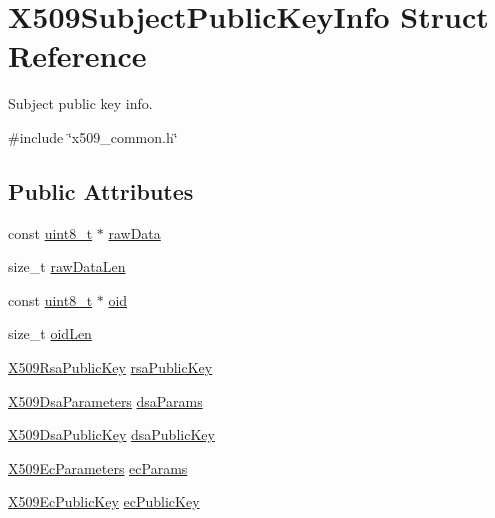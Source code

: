 \hypertarget{structX509SubjectPublicKeyInfo}{}\section{X509\+Subject\+Public\+Key\+Info Struct Reference}
\label{structX509SubjectPublicKeyInfo}


Subject public key info.  




{\ttfamily \#include \char`\"{}x509\+\_\+common.\+h\char`\"{}}

\subsection*{Public Attributes}
\begin{DoxyCompactItemize}
\item 
const \hyperlink{stdint_8h_aba7bc1797add20fe3efdf37ced1182c5}{uint8\+\_\+t} $\ast$ \hyperlink{structX509SubjectPublicKeyInfo_a40099adba11d706e320a0d553b9e2438}{raw\+Data}
\item 
size\+\_\+t \hyperlink{structX509SubjectPublicKeyInfo_a1397c8953cfe641fda3a326479b48dbd}{raw\+Data\+Len}
\item 
const \hyperlink{stdint_8h_aba7bc1797add20fe3efdf37ced1182c5}{uint8\+\_\+t} $\ast$ \hyperlink{structX509SubjectPublicKeyInfo_a90a8b808782b18de901306acd49b0706}{oid}
\item 
size\+\_\+t \hyperlink{structX509SubjectPublicKeyInfo_a7c5d6f507f653f6085ba56e6b4b55912}{oid\+Len}
\item 
\hyperlink{structX509RsaPublicKey}{X509\+Rsa\+Public\+Key} \hyperlink{structX509SubjectPublicKeyInfo_ab8bc6398001418fd21271ff8b791caab}{rsa\+Public\+Key}
\item 
\hyperlink{structX509DsaParameters}{X509\+Dsa\+Parameters} \hyperlink{structX509SubjectPublicKeyInfo_a2a4f7c14413231aa4a09a59390b4f6c0}{dsa\+Params}
\item 
\hyperlink{structX509DsaPublicKey}{X509\+Dsa\+Public\+Key} \hyperlink{structX509SubjectPublicKeyInfo_aca3c9dc2e4fefc2e5ac0f1db6baedccc}{dsa\+Public\+Key}
\item 
\hyperlink{structX509EcParameters}{X509\+Ec\+Parameters} \hyperlink{structX509SubjectPublicKeyInfo_af45ca47e19db60631c9fdb4d4b62ed10}{ec\+Params}
\item 
\hyperlink{structX509EcPublicKey}{X509\+Ec\+Public\+Key} \hyperlink{structX509SubjectPublicKeyInfo_af9b3b1e9d01c44192f01edbf14001622}{ec\+Public\+Key}
\end{DoxyCompactItemize}


